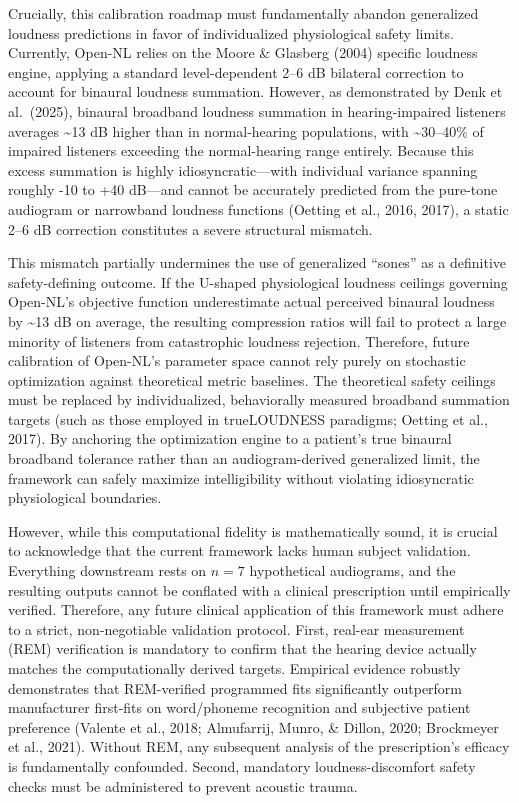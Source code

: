 \documentclass[
  12pt,
]{article}
\begin{document}
Crucially, this calibration roadmap must fundamentally abandon
generalized loudness predictions in favor of individualized
physiological safety limits. Currently, Open-NL relies on the Moore \&
Glasberg (2004) specific loudness engine, applying a standard
level-dependent 2--6 dB bilateral correction to account for binaural
loudness summation. However, as demonstrated by Denk et al.~(2025),
binaural broadband loudness summation in hearing-impaired listeners
averages \textasciitilde13 dB higher than in normal-hearing populations,
with \textasciitilde30--40\% of impaired listeners exceeding the
normal-hearing range entirely. Because this excess summation is highly
idiosyncratic---with individual variance spanning roughly -10 to +40
dB---and cannot be accurately predicted from the pure-tone audiogram or
narrowband loudness functions (Oetting et al., 2016, 2017), a static
2--6 dB correction constitutes a severe structural mismatch.

This mismatch partially undermines the use of generalized ``sones'' as a
definitive safety-defining outcome. If the U-shaped physiological
loudness ceilings governing Open-NL's objective function underestimate
actual perceived binaural loudness by \textasciitilde13 dB on average,
the resulting compression ratios will fail to protect a large minority
of listeners from catastrophic loudness rejection. Therefore, future
calibration of Open-NL's parameter space cannot rely purely on
stochastic optimization against theoretical metric baselines. The
theoretical safety ceilings must be replaced by individualized,
behaviorally measured broadband summation targets (such as those
employed in trueLOUDNESS paradigms; Oetting et al., 2017). By anchoring
the optimization engine to a patient's true binaural broadband tolerance
rather than an audiogram-derived generalized limit, the framework can
safely maximize intelligibility without violating idiosyncratic
physiological boundaries.

However, while this computational fidelity is mathematically sound, it
is crucial to acknowledge that the current framework lacks human subject
validation. Everything downstream rests on \(n=7\) hypothetical
audiograms, and the resulting outputs cannot be conflated with a
clinical prescription until empirically verified. Therefore, any future
clinical application of this framework must adhere to a strict,
non-negotiable validation protocol. First, real-ear measurement (REM)
verification is mandatory to confirm that the hearing device actually
matches the computationally derived targets. Empirical evidence robustly
demonstrates that REM-verified programmed fits significantly outperform
manufacturer first-fits on word/phoneme recognition and subjective
patient preference (Valente et al., 2018; Almufarrij, Munro, \& Dillon,
2020; Brockmeyer et al., 2021). Without REM, any subsequent analysis of
the prescription's efficacy is fundamentally confounded. Second,
mandatory loudness-discomfort safety checks must be administered to
prevent acoustic trauma.
\end{document}
